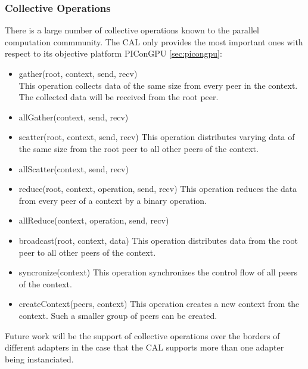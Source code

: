 \subsubsection{Collective Operations}
There is a large number of collective operations known to the
parallel computation commmunity. The CAL only provides the most
important ones with respect to its objective platform PIConGPU \ref{sec:picongpu}:

\begin{itemize}
\item gather(root, context, send, recv)\\
  This operation collects data of the same size from
  every peer in the context. The collected data will be
  received from the root peer.
\item allGather(context, send, recv)
\item scatter(root, context, send, recv)
  This operation distributes varying data of the same size from the root peer to
  all other peers of the context.
\item allScatter(context, send, recv)

\item reduce(root, context, operation, send, recv)
  This operation reduces the data from every peer of a context by
  a binary operation.
\item allReduce(context, operation, send, recv)

\item broadcast(root, context, data)
  This operation distributes data from the root peer to
  all other peers of the context.
\item syncronize(context)
  This operation synchronizes the control flow of all peers of the context.
\item createContext(peers, context)
  This operation creates a new context from the context. Such a smaller
  group of peers can be created.
\end{itemize}

Future work will be the support of collective operations over the borders
of different adapters in the case that the CAL supports more than one adapter
being instanciated.


